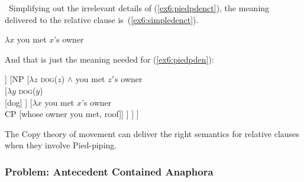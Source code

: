 %
%
%
\ Simplifying out the irrelevant details of (\ref{ex6:piedpdenct}), the meaning delivered to the relative clause is~(\ref{ex6:simpledenct}).
\begin{exe}
\raggedright
	\ex \label{ex6:simpledenct} $\lambda x$ you met $x$'s owner
\end{exe}
And that is just the meaning needed for (\ref{ex6:piedpden}):
\begin{exe}
\raggedright
	\ex \label{ex6:piedpdenfinal}
	\small
	\begin{forest}
	[DP
		[\obar{D} [the]]
		[NP 
		[$\lambda z$ \textsc{dog}($z$) $\wedge$ you met $z's$ owner\\
			[$\lambda y$ \textsc{dog}($y$)\\ [dog] ]
			[$\lambda x$ you met $x$'s owner\\CP [whose owner you met, roof]]
		] ]
	]
	\end{forest}
\end{exe}

The Copy theory of movement can deliver the right semantics for relative clauses when they involve Pied-piping.

\subsubsection{Problem: Antecedent Contained Anaphora}
\label{sec:acdproblem}

